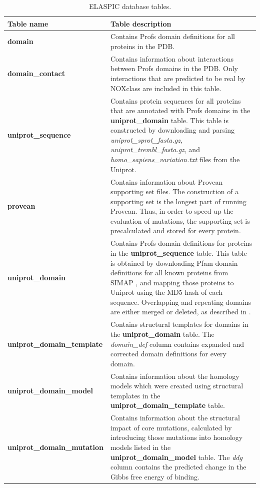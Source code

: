 \begin{table}[ht]
\caption{ELASPIC database tables.} \label{tab:elaspic_schema_description}
\begin{tabular}{l | p{10cm}}
	\toprule
	Table name & Table description \\
	\midrule
	\textbf{domain} & Contains Profs domain definitions for all proteins in the PDB. \\
	\textbf{domain\_contact} & Contains information about interactions between Profs domains in the PDB. Only interactions that are predicted to be real by NOXclass \cite{zhu_noxclass:_2006} are included in this table. \\
	\textbf{uniprot\_sequence} & Contains protein sequences for all proteins that are annotated with Profs domains in the \textbf{uniprot\_domain} table. This table is constructed by downloading and parsing \textit{uniprot\_sprot\_fasta.gz}, \textit{uniprot\_trembl\_fasta.gz}, and \textit{homo\_sapiens\_variation.txt} files from the Uniprot. \\
	\textbf{provean} & Contains information about Provean \cite{choi_predicting_2012} supporting set files. The construction of a supporting set is the longest part of running Provean. Thus, in order to speed up the evaluation of mutations, the supporting set is precalculated and stored for every protein. \\
	\textbf{uniprot\_domain} & Contains Profs domain definitions for proteins in the \textbf{uniprot\_sequence} table. This table is obtained by downloading Pfam domain definitions for all known proteins from SIMAP \cite{rattei_simapcomprehensive_2010}, and mapping those proteins to Uniprot using the MD5 hash of each sequence. Overlapping and repeating domains are either merged or deleted, as described in \cite{witvliet_elaspic_2016}. \\
	\textbf{uniprot\_domain\_template} & Contains structural templates for domains in the \textbf{uniprot\_domain} table. The \textit{domain\_def} column contains expanded and corrected domain definitions for every domain. \\
	\textbf{uniprot\_domain\_model} & Contains information about the homology models which were created using structural templates in the \textbf{uniprot\_domain\_template} table. \\
	\textbf{uniprot\_domain\_mutation} & Contains information about the structural impact of core mutations, calculated by introducing those mutations into homology models listed in the \textbf{uniprot\_domain\_model} table. The \textit{ddg} column contains the predicted change in the Gibbs free energy of binding. \\

\end{tabular}
\end{table}
